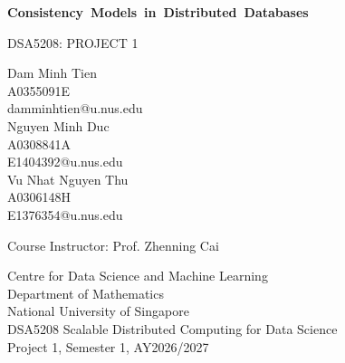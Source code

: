 \documentclass[11pt,a4paper]{article}
\begin{document}
\begin{titlepage}
\thispagestyle{empty}
\centering
\vspace*{0.11\textheight}
{\fontsize{18}{24}\selectfont\bfseries
\mbox{Consistency Models in Distributed Databases}\par}
\vspace{1.5cm}
{\fontsize{12}{18}\selectfont
DSA5208: PROJECT 1\par}
\vspace{1.2cm}
{\fontsize{12}{18}\selectfont
Dam Minh Tien\\
A0355091E\\
damminhtien@u.nus.edu\\[0.8em]
Nguyen Minh Duc\\
A0308841A\\
E1404392@u.nus.edu\\[0.8em]
Vu Nhat Nguyen Thu\\
A0306148H\\
E1376354@u.nus.edu\par}
\vspace{1.2cm}
{\fontsize{12}{18}\selectfont
Course Instructor: Prof. Zhenning Cai\par}
\vfill
{\fontsize{12}{18}\selectfont
Centre for Data Science and Machine Learning\\
Department of Mathematics\\
National University of Singapore\\[0.8em]
DSA5208 Scalable Distributed Computing for Data Science\\
Project 1, Semester 1, AY2026/2027\par}
\end{titlepage}
\restoregeometry



\clearpage
{}
\tableofcontents
\clearpage
{}
\listoffigures
{}
\listoftables

\clearpage
{}








\clearpage
{}




\appendix

\end{document}

